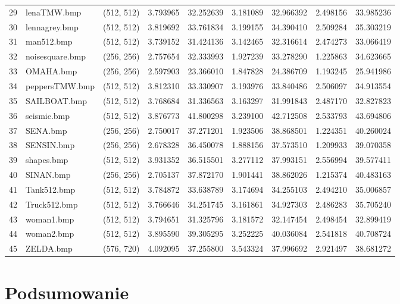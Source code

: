 \documentclass{article}
\begin{document}
\begin{table}[H]
\begin{adjustbox}{center}
\begin{tabular}{lllrrrrrr}
    29 &        lenaTMW.bmp &  (512, 512) &  3.793965 &  32.252639 &  3.181089 &  32.966392 &  2.498156 &  33.985236 \\
    30 &      lennagrey.bmp &  (512, 512) &  3.819692 &  33.761834 &  3.199155 &  34.390410 &  2.509284 &  35.303219 \\
    31 &         man512.bmp &  (512, 512) &  3.739152 &  31.424136 &  3.142465 &  32.316614 &  2.474273 &  33.066419 \\
    32 &    noisesquare.bmp &  (256, 256) &  2.757654 &  32.333993 &  1.927239 &  33.278290 &  1.225863 &  34.623665 \\
    33 &          OMAHA.bmp &  (256, 256) &  2.597903 &  23.366010 &  1.847828 &  24.386709 &  1.193245 &  25.941986 \\
    34 &     peppersTMW.bmp &  (512, 512) &  3.812310 &  33.330907 &  3.193976 &  33.840486 &  2.506097 &  34.913554 \\
    35 &       SAILBOAT.bmp &  (512, 512) &  3.768684 &  31.336563 &  3.163297 &  31.991843 &  2.487170 &  32.827823 \\
    36 &        seismic.bmp &  (512, 512) &  3.876773 &  41.800298 &  3.239100 &  42.712508 &  2.533793 &  43.694806 \\
    37 &           SENA.bmp &  (256, 256) &  2.750017 &  37.271201 &  1.923506 &  38.868501 &  1.224351 &  40.260024 \\
    38 &         SENSIN.bmp &  (256, 256) &  2.678328 &  36.450078 &  1.888156 &  37.573510 &  1.209933 &  39.070358 \\
    39 &         shapes.bmp &  (512, 512) &  3.931352 &  36.515501 &  3.277112 &  37.993151 &  2.556994 &  39.577411 \\
    40 &          SINAN.bmp &  (256, 256) &  2.705137 &  37.872170 &  1.901441 &  38.862026 &  1.215374 &  40.483163 \\
    41 &        Tank512.bmp &  (512, 512) &  3.784872 &  33.638789 &  3.174694 &  34.255103 &  2.494210 &  35.006857 \\
    42 &       Truck512.bmp &  (512, 512) &  3.766646 &  34.251745 &  3.161861 &  34.927303 &  2.486283 &  35.705240 \\
    43 &         woman1.bmp &  (512, 512) &  3.794651 &  31.325796 &  3.181572 &  32.147454 &  2.498454 &  32.899419 \\
    44 &         woman2.bmp &  (512, 512) &  3.895590 &  39.305295 &  3.252225 &  40.036084 &  2.541818 &  40.708724 \\
    45 &          ZELDA.bmp &  (576, 720) &  4.092095 &  37.255800 &  3.543324 &  37.996692 &  2.921497 &  38.681272 \\
    \bottomrule
    \end{tabular}
\end{adjustbox}
\end{table}


\section{Podsumowanie}

\lipsum[1-3]


\end{document}
